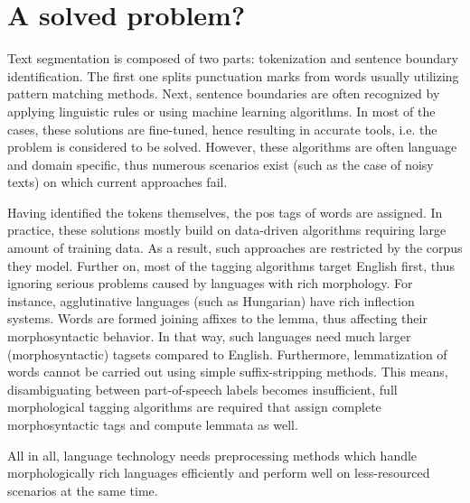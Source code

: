 \section{A solved problem?}



Text segmentation is composed of two parts: tokenization and sentence boundary identification. 
The first one splits punctuation marks from words usually utilizing  pattern matching methods.
Next, sentence boundaries are often recognized by applying linguistic rules or using machine learning algorithms.
In most of the cases, these solutions are fine-tuned, hence resulting in accurate tools, i.e. the problem is considered to be solved.
However, these algorithms are often language and domain specific, thus numerous scenarios exist (such as the case of noisy texts) on which current approaches fail.

Having identified the tokens themselves, the \gls{pos} tags of words are assigned.
In practice, these solutions mostly build on data-driven algorithms requiring large amount of training data.
As a result, such approaches are restricted by the corpus they model.
Further on, most of the tagging algorithms target English first, thus ignoring serious problems caused by languages with rich morphology.
For instance, agglutinative languages (such as Hungarian) have rich inflection systems.
Words are formed joining affixes to the lemma, thus affecting their morphosyntactic behavior.
In that way, such languages need much larger (morphosyntactic) tagsets compared to English. 
Furthermore, lemmatization of words cannot be carried out using simple suffix-stripping methods.
This means, disambiguating between part-of-speech labels becomes insufficient, full morphological tagging algorithms are required that assign complete morphosyntactic tags and compute lemmata as well.

All in all, language technology needs preprocessing methods which handle morphologically rich languages efficiently 
and perform well on less-resourced scenarios at the same time.

